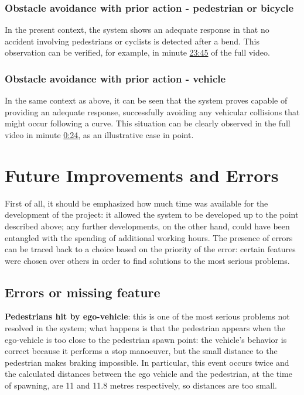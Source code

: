 \documentclass{article}
\begin{document}
\subsubsection{Obstacle avoidance with prior action - pedestrian or bicycle}
In the present context, the system shows an adequate response in that no accident involving pedestrians or cyclists is detected after a bend. This observation can 
be verified, for example, in minute \href{https://youtu.be/RBGWd_so80U?t=1425}{23:45}  of the full video.
\subsubsection{Obstacle avoidance with prior action - vehicle}
In the same context as above, it can be seen that the system proves capable of providing an adequate response, successfully avoiding any vehicular collisions that might 
occur following a curve. This situation can be clearly observed in the full video in minute \href{https://youtu.be/RBGWd_so80U?t=24}{0:24}, as an illustrative case in point.

\section{Future Improvements and Errors}
First of all, it should be emphasized how much time was available for the development of the project: it allowed the system to 
be developed up to the point described above; any further developments, on the other hand, could have been entangled with the 
spending of additional working hours. 
The presence of errors can be traced back to a choice based on the priority of the error: certain features were chosen over 
others in order to find solutions to the most serious problems.
\subsection{Errors or missing feature}
\textbf{Pedestrians hit by ego-vehicle}: this is one of the most serious problems not resolved in the system; what 
    happens is that the pedestrian appears when the ego-vehicle is too close to the pedestrian spawn point: the vehicle's behavior 
    is correct because it performs a stop manoeuver, but the small distance to the pedestrian makes braking impossible. 
    In particular, this event occurs twice and the calculated distances between the ego vehicle and the pedestrian, at the time of spawning, 
    are 11 and 11.8 metres respectively, so distances are too small.
\end{document}
